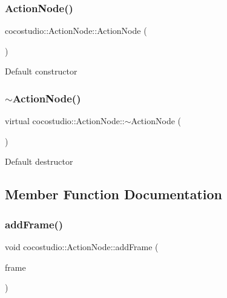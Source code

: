 \subsubsection{\texorpdfstring{Action\+Node()}{ActionNode()}\hspace{0.1cm}{\footnotesize\ttfamily [2/2]}}
{\footnotesize\ttfamily cocostudio\+::\+Action\+Node\+::\+Action\+Node (\begin{DoxyParamCaption}{ }\end{DoxyParamCaption})}

Default constructor \mbox{\label{classcocostudio_1_1ActionNode_a2828e1138b60a9dbb3a744f9808c41e9}} 
\subsubsection{\texorpdfstring{$\sim$\+Action\+Node()}{~ActionNode()}\hspace{0.1cm}{\footnotesize\ttfamily [2/2]}}
{\footnotesize\ttfamily virtual cocostudio\+::\+Action\+Node\+::$\sim$\+Action\+Node (\begin{DoxyParamCaption}{ }\end{DoxyParamCaption})\hspace{0.3cm}{\ttfamily [virtual]}}

Default destructor 

\subsection{Member Function Documentation}
\mbox{\label{classcocostudio_1_1ActionNode_a982d01cb4931e108f5d02bf3cc6ec9c3}} 
\subsubsection{\texorpdfstring{add\+Frame()}{addFrame()}\hspace{0.1cm}{\footnotesize\ttfamily [1/2]}}
{\footnotesize\ttfamily void cocostudio\+::\+Action\+Node\+::add\+Frame (\begin{DoxyParamCaption}\item[{\hyperlink{classcocostudio_1_1ActionFrame}{Action\+Frame} $\ast$}]{frame }\end{DoxyParamCaption})}

